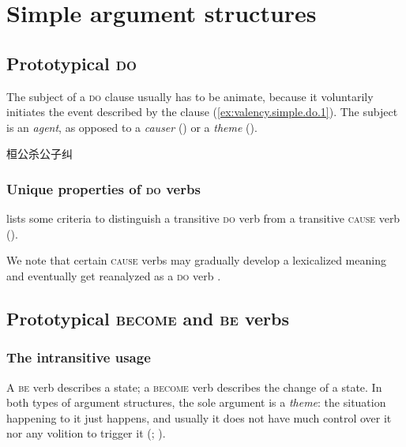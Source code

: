 \documentclass[UTF8, a4paper, oneside, scheme=plain, 12pt]{ctexrep}
\newcommand*{\citepage}[1]{p.~{#1}}
\newcommand*{\citepages}[1]{pp.~{#1}}
\newcommand*{\term}[1]{\emph{#1}}
\newcommand*{\category}[1]{\textsc{#1}}
\begin{document}
\section{Simple argument structures}
\label{sec:grammatical.clause.verbal.argument.simple}

\subsection{Prototypical \category{do}}
\label{sec:valency.simple.do}

The subject of a \category{do} clause usually has to be animate,
because it voluntarily initiates the event described by the clause
(\ref{ex:valency.simple.do.1}).
The subject is an \term{agent}, as opposed to a \term{causer} ()
or a \term{theme} ().

\begin{exe}
    \ex\label{ex:valency.simple.do.1} 桓公杀公子纠
\end{exe}

\subsubsection{Unique properties of \category{do} verbs}\label{sec:valency.simple.do.properties}

\citet[\citepage{272}]{meiguang2018} lists some criteria
to distinguish a transitive \category{do} verb 
from a transitive \category{cause} verb
().

We note that certain \category{cause} verbs may gradually develop a lexicalized meaning
and eventually get reanalyzed as a \category{do} verb
\citep[\citepages{269-271}]{meiguang2018}.

\subsection{Prototypical \category{become} and \category{be} verbs}
\label{sec:valency.simple.state-and-change}

\subsubsection{The intransitive usage}

A \category{be} verb describes a state;
a \category{become} verb describes the change of a state.
In both types of argument structures,
the sole argument is a \term{theme}:
the situation happening to it just happens,
and usually it does not have much control over it nor any volition to trigger it
(\citealt[\citepage{345}]{li2004grammar}; \citealt[\citepage{275}]{meiguang2018}).
\end{document}
